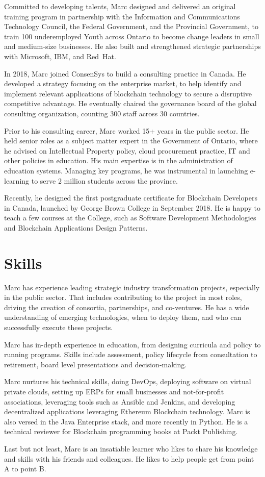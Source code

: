 \documentclass[11pt,letterpaper,sans]{moderncv}        %
\begin{document}
Committed to developing talents, Marc designed and delivered an original training program in partnership with the Information and Communications Technology Council, the Federal Government, and the Provincial Government, to train 100 underemployed Youth across Ontario to become change leaders in small and medium-size businesses.
He also built and strengthened strategic partnerships with Microsoft, IBM, and Red~Hat.

In 2018, Marc joined ConsenSys to build a consulting practice in Canada.
He developed a strategy focusing on the enterprise market, to help identify and implement relevant applications of blockchain technology to secure a disruptive competitive advantage.
He eventually chaired the governance board of the global consulting organization, counting 300 staff across 30 countries.

Prior to his consulting career, Marc worked 15+ years in the public sector.
He held senior roles as a subject matter expert in the Government of Ontario, where he advised on Intellectual Property policy, cloud procurement practice, IT and other policies in education.
His main expertise is in the administration of education systems.
Managing key programs, he was instrumental in launching e-learning to serve 2 million students across the province.

Recently, he designed the first postgraduate certificate for Blockchain Developers in Canada, launched by George Brown College in September 2018.
He is happy to teach a few courses at the College, such as Software Development Methodologies and Blockchain Applications Design Patterns.

\section{Skills}
Marc has experience leading strategic industry transformation projects, especially in the public sector.
That includes contributing to the project in most roles, driving the creation of consortia, partnerships, and co-ventures.
He has a wide understanding of emerging technologies, when to deploy them, and who can successfully execute these projects.

Marc has in-depth experience in education, from designing curricula and policy to running programs.
Skills include assessment, policy lifecycle from consultation to retirement, board level presentations and decision-making.

Marc nurtures his technical skills, doing DevOps, deploying software on virtual private clouds, setting up ERPs for small businesses and not-for-profit associations, leveraging tools such as Ansible and Jenkins, and developing decentralized applications leveraging Ethereum Blockchain technology.
Marc is also versed in the Java Enterprise stack, and more recently in Python.
He is a technical reviewer for Blockchain programming books at Packt Publishing.

Last but not least, Marc is an insatiable learner who likes to share his knowledge and skills with his friends and colleagues.
He likes to help people get from point A to point B.
\end{document}
